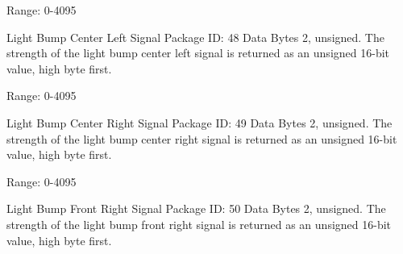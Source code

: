 \begin{Desc}
\begin{description}
Range\+: 0-\/4095 \item[{\em 
\hypertarget{group__roomba-lib_gga46f008b5055c4a08d3123c6a3478373ea5987a92277142efcf0ed3cabba1a1bae}{}R\+O\+O\+M\+B\+A\+\_\+\+L\+I\+G\+H\+T\+\_\+\+B\+U\+M\+P\+\_\+\+C\+E\+N\+T\+E\+R\+\_\+\+L\+E\+F\+T\label{group__roomba-lib_gga46f008b5055c4a08d3123c6a3478373ea5987a92277142efcf0ed3cabba1a1bae}
}]Light Bump Center Left Signal Package I\+D\+: 48 Data Bytes 2, unsigned. The strength of the light bump center left signal is returned as an unsigned 16-\/bit value, high byte first.

Range\+: 0-\/4095 \item[{\em 
\hypertarget{group__roomba-lib_gga46f008b5055c4a08d3123c6a3478373ea6105c9a570e4b4a7e69262f113f03fe1}{}R\+O\+O\+M\+B\+A\+\_\+\+L\+I\+G\+H\+T\+\_\+\+B\+U\+M\+P\+\_\+\+C\+E\+N\+T\+E\+R\+\_\+\+R\+I\+G\+H\+T\label{group__roomba-lib_gga46f008b5055c4a08d3123c6a3478373ea6105c9a570e4b4a7e69262f113f03fe1}
}]Light Bump Center Right Signal Package I\+D\+: 49 Data Bytes 2, unsigned. The strength of the light bump center right signal is returned as an unsigned 16-\/bit value, high byte first.

Range\+: 0-\/4095 \item[{\em 
\hypertarget{group__roomba-lib_gga46f008b5055c4a08d3123c6a3478373ea94217c4da645d2bed66a8ef46485b776}{}R\+O\+O\+M\+B\+A\+\_\+\+L\+I\+G\+H\+T\+\_\+\+B\+U\+M\+P\+\_\+\+F\+R\+O\+N\+T\+\_\+\+R\+I\+G\+H\+T\label{group__roomba-lib_gga46f008b5055c4a08d3123c6a3478373ea94217c4da645d2bed66a8ef46485b776}
}]Light Bump Front Right Signal Package I\+D\+: 50 Data Bytes 2, unsigned. The strength of the light bump front right signal is returned as an unsigned 16-\/bit value, high byte first.


\end{description}
\end{Desc}
